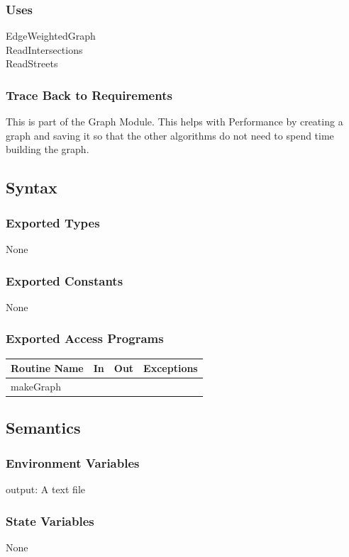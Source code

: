 \documentclass[12pt]{article}
\begin{document}
\subsubsection*{Uses}
EdgeWeightedGraph\\
ReadIntersections\\
ReadStreets

\subsubsection*{Trace Back to Requirements}
This is part of the Graph Module. This helps with Performance by creating a graph and saving it so that the other algorithms do not need to spend time building the graph.

\subsection*{Syntax}
\subsubsection*{Exported Types}
None

\subsubsection*{Exported Constants}
None

\subsubsection*{Exported Access Programs}
    \begin{tabular}{|l|l|l|l|}
    \hline
    \textbf{Routine Name} & \textbf{In} & \textbf{Out} & \textbf{Exceptions}\\
    \hline
    makeGraph &  ~ & ~ & ~\\
    \hline
    \end{tabular}
    
\subsection*{Semantics}
\subsubsection*{Environment Variables}
output: A text file

\subsubsection*{State Variables}
None
\end{document}
